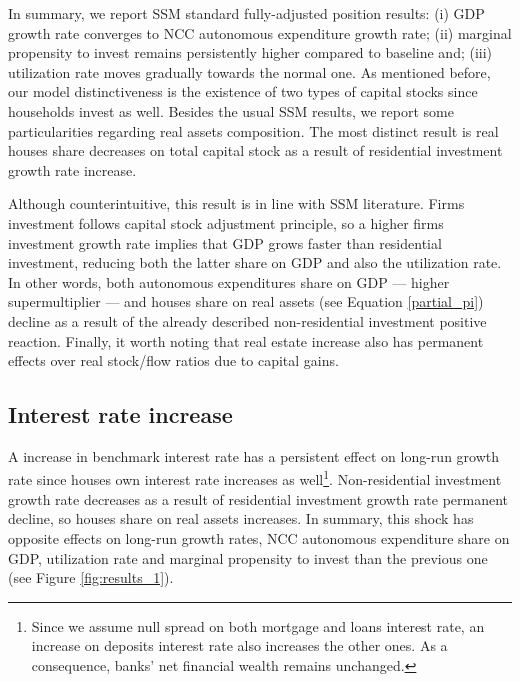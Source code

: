\documentclass[11pt]{article}
\begin{document}
In summary, we report SSM standard fully-adjusted position results:
    (i) GDP growth rate converges to NCC autonomous expenditure growth rate;
    (ii) marginal propensity to invest remains persistently higher compared to baseline and;
    (iii) utilization rate moves gradually towards the normal one.
As mentioned before, our model distinctiveness is the existence of two types of capital stocks since households invest as well.
Besides the usual SSM results, we report some particularities regarding real assets composition.
The most distinct result is real houses share decreases on total capital stock as a result of residential investment growth rate increase.

Although counterintuitive, this result is in line with SSM literature.
Firms investment follows capital stock adjustment principle, so a higher firms investment growth rate implies that
GDP grows faster than residential investment, reducing both the latter share on GDP and
also the utilization rate.
In other words, both autonomous expenditures share on GDP --- higher supermultiplier --- and houses share on real assets (see Equation \ref{partial_pi}) decline as a result of the already described non-residential investment positive reaction.
Finally, it worth noting that real estate increase also has permanent effects over real stock/flow ratios due to capital gains.
\subsection{Interest rate increase}
\label{sec:org1d484fa}
\label{sec:Exp3}

A increase in benchmark interest rate  has a persistent effect on long-run growth rate since houses own interest rate increases as well\footnote{Since we assume null spread on both mortgage and loans interest rate, an increase on deposits interest rate also increases the other ones. As a consequence, banks' net financial wealth remains unchanged.}.
Non-residential investment growth rate decreases as a result of residential investment growth rate permanent decline, so houses share on real assets increases.
In summary, this shock has opposite effects on long-run growth rates, NCC autonomous expenditure share on GDP, utilization rate and marginal propensity to invest  than the previous one (see Figure \ref{fig:results_1}).
\end{document}
